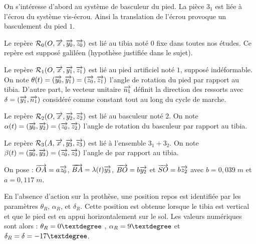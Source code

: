 \documentclass[10pt,fleqn]{article} %
\begin{document}
\noindent\begin{minipage}[c]{.54\linewidth}
On s'intéresse d'abord au système de basculeur du pied. La pièce $3_1$ est liée à l'écrou du système vis-écrou. Ainsi la translation de l'écrou provoque un basculement du pied $1$. 

Le repère $\mathcal{R}_{0} (O, \overrightarrow{x_{}},\overrightarrow{y_{0}} ,\overrightarrow{z_{0}})$ est lié au tibia noté $0$ fixe dans toutes nos études. Ce repère est supposé galiléen (hypothèse justifiée dans le sujet).

Le repère $\mathcal{R}_{1} (O, \overrightarrow{x_{}},\overrightarrow{y_{1}} ,\overrightarrow{z_{1}} )$ est lié au pied artificiel noté $1$, supposé indéformable. On note $\theta (t)=(\overrightarrow{y_{0}} ,\overrightarrow{y_{1}})=(\overrightarrow{z_{0}},\overrightarrow{z_{1}})$ l'angle de rotation du pied par rapport au tibia. D'autre part, le vecteur unitaire $\overrightarrow{n_1}$ définit la direction des ressorts avec $\delta=(\overrightarrow{y_{1}} ,\overrightarrow{n_1})$ considéré comme constant tout au long
du cycle de marche.

Le repère $\mathcal{R}_{2} (O, \overrightarrow{x_{}} ,\overrightarrow{y_{2}} ,\overrightarrow{z_{2}} )$ est lié au basculeur noté $2$. On note $\alpha(t) =(\overrightarrow{y_{0}} ,\overrightarrow{y_{2}})=(\overrightarrow{z_{0}} ,\overrightarrow{z_{2}})$ l'angle de rotation du basculeur par rapport au tibia.

Le repère $\mathcal{R}_{3} ( A, \overrightarrow{x_{}},\overrightarrow{y_{3}} ,\overrightarrow{z_{3}})$ est lié à l'ensemble $3_1+3_2$. On note $\beta(t )=(\overrightarrow{y_{0}} ,\overrightarrow{y_{3}})=(\overrightarrow{z_{0}} ,\overrightarrow{z_{3}})$ l'angle de par rapport au tibia.

On pose : $\overrightarrow{OA}=a\overrightarrow{z_0}$, $\overrightarrow{BA}=\lambda(t)\overrightarrow{y_{3}}$, $\overrightarrow{BO}=b\overrightarrow{y_{2}}$ et 
$\overrightarrow{SO}=b\overrightarrow{z_{2}}$ avec $b=0,039 \; m$ et $a=0,117\;m$.

En l'absence d'action sur la prothèse, une position repos est identifiée par les paramètres $\theta_R$, $\alpha_R$, et $\delta_R$. Cette position est obtenue lorsque le tibia est vertical et que le pied est en appui horizontalement
sur le sol. Les valeurs numériques sont alors : $\theta_R=0\textdegree$ , $\alpha_R=9\textdegree$ et $\delta_R=\delta=-17\textdegree$.
\end{minipage} \hfill
\end{document}
